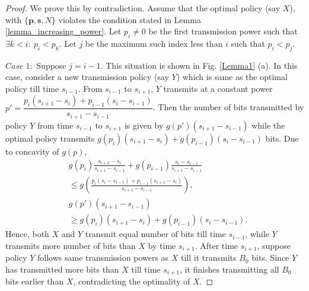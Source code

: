\begin{proof}
We prove this by contradiction. Assume that the optimal policy (say $X$), with $\{\bm{p},\bm{s},N\}$ violates the condition stated in Lemma \ref{lemma_increasing_power}. Let $p_i\neq 0$ be the first transmission power such that $\exists k<i:\ p_i<p_k $. Let $j$ be the maximum such index less than $i$ such that $p_i<p_j$. 

%

$Case\;1:$ Suppose $j=i-1$. This situation is shown in Fig. \ref{Lemma1} (a). In this case, consider a new transmission policy (say $Y$) which is same as the optimal policy till time $s_{i-1}$. From $s_{i-1}$ to $s_{i+1}$, $Y$ transmits at a constant power $p'=\dfrac{p_i(s_{i+1}-s_{i})+p_{i-1}(s_{i}-s_{i-1})}{s_{i+1}-s_{i-1}}$. Then the number of bits transmitted by policy $Y$ from time $s_{i-1}$ to $s_{i+1}$ is given by $g(p')(s_{i+1}-s_{i-1})$ while the optimal policy transmits $g(p_i)(s_{i+1}-s_{i})+g(p_{i-1})(s_{i}-s_{i-1})$ bits. Due to concavity of $g(p)$,
\begin{align*}
&g(p_i)\frac{s_{i+1}-s_{i}}{s_{i+1}-s_{i-1}}+g(p_{i-1})\frac{s_{i}-s_{i-1}}{s_{i+1}-s_{i-1}}
\\ 
&\le g\left(\frac{p_i(s_{i}-s_{i-1})+p_{i-1}(s_{i+1}-s_{i})}{s_{i+1}-s_{i-1}}\right),
\\
& g(p')(s_{i+1}-s_{i-1})
\\
&\ge g(p_i)(s_{i+1}-s_{i})+g(p_{i-1})(s_{i}-s_{i-1}).  
\end{align*}
Hence, both $X$ and $Y$ transmit equal number of bits till time $s_{i-1}$, while $Y$ transmits more number of bits than $X$ by time $s_{i+1}$. After time $s_{i+1}$, suppose policy $Y$ follows same transmission powers as $X$ till it transmits $B_0$ bits. Since $Y$ has transmitted more bits than $X$ till time $s_{i+1}$, it finishes transmitting all $B_0$ bits earlier than $X$, contradicting the optimality of $X$.


\end{proof}
